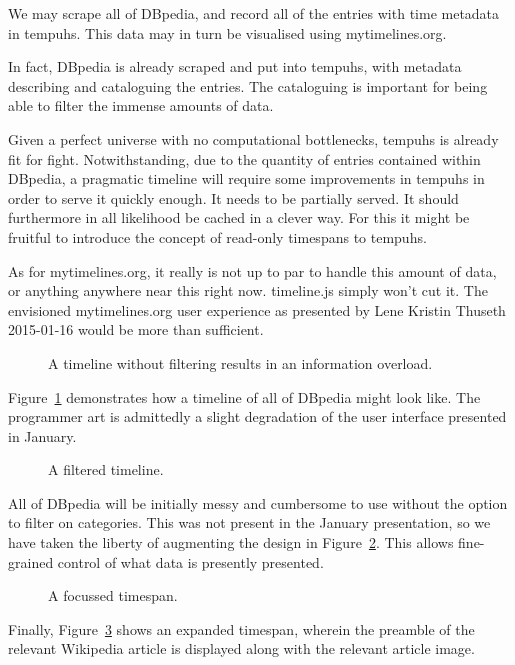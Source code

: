 We may scrape all of DBpedia, and record all of the entries with time metadata 
in tempuhs. This data may in turn be visualised using mytimelines.org.

In fact, DBpedia is already scraped and put into tempuhs, with metadata 
describing and cataloguing the entries. The cataloguing is important for being
able to filter the immense amounts of data.

Given a perfect universe with no computational bottlenecks, tempuhs is already 
fit for fight. Notwithstanding, due to the quantity of entries contained 
within DBpedia, a pragmatic timeline will require some improvements in tempuhs 
in order to serve it quickly enough. It needs to be partially served. It 
should furthermore in all likelihood be cached in a clever way. For this it 
might be fruitful to introduce the concept of read-only timespans to tempuhs.

As for mytimelines.org, it really is not up to par to handle this amount of 
data, or anything anywhere near this right now. timeline.js simply won't cut 
it. The envisioned mytimelines.org user experience as presented by Lene 
Kristin Thuseth 2015-01-16 would be more than sufficient. 

\begin{figure}[H]
  \centering
  \begin{scale}{0.3}
    
  \end{scale}
  \caption{A timeline without filtering results in an information overload.}
  \label{fig:overload}
\end{figure}

Figure~\ref{fig:overload} demonstrates how a timeline of all of DBpedia might 
look like. The programmer art is admittedly a slight degradation of the user 
interface presented in January.

\begin{figure}[H]
  \centering
  \begin{scale}{0.3}
    
  \end{scale}
  \caption{A filtered timeline.}
  \label{fig:filtered}
\end{figure}

All of DBpedia will be initially messy and cumbersome to use without the 
option to filter on categories. This was not present in the January 
presentation, so we have taken the liberty of augmenting the design in 
Figure~\ref{fig:filtered}. This allows fine-grained control of what data is 
presently presented.

\begin{figure}[H]
  \centering
  \begin{scale}{0.3}
    
  \end{scale}
  \caption{A focussed timespan.}
  \label{fig:focussed}
\end{figure}

Finally, Figure~\ref{fig:focussed} shows an expanded timespan, wherein the 
preamble of the relevant Wikipedia article is displayed along with the 
relevant article image.
